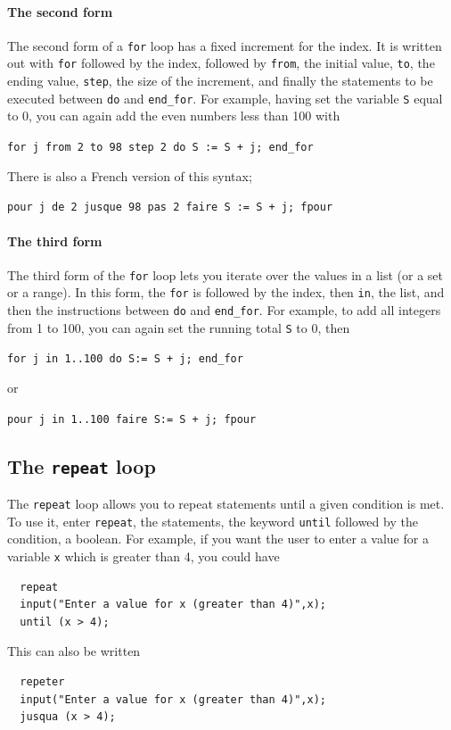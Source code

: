 \documentclass[a4paper,11pt]{book}
\begin{document}
\paragraph{The second form}
The second form of a \texttt{for} loop has a fixed increment for the
index.  It is
written out with \texttt{for} followed by the index, followed by
\texttt{from}, the initial value, \texttt{to}, the ending value,
\texttt{step}, the size of the increment, and finally the statements
to be executed between \texttt{do} and \texttt{end\_for}.  For
example, having set the variable \texttt{S} equal to 0, you can again
add the even numbers less than 100 with
\begin{center}
  {\tt for j from 2 to 98 step 2 do S := S + j; end\_for}
\end{center}
There is also a French version of this syntax;
\begin{center}
  {\tt pour j de 2 jusque 98 pas 2 faire S := S + j; fpour}
\end{center}

\paragraph{The third form}
The third form of the \texttt{for} loop lets you iterate over the
values in a list (or a set or a range).  In this form, the
\texttt{for} is followed by the index, then \texttt{in}, the list, and
then the instructions between \texttt{do} and \texttt{end\_for}.  For
example, to add all integers from 1 to 100, you can again set the
running total \texttt{S} to 0, then
\begin{center}
  {\tt for j in 1..100 do S:= S + j; end\_for}
\end{center}
or
\begin{center}
  {\tt pour j in 1..100 faire S:= S + j; fpour}
\end{center}

\subsection{The \texttt{repeat} loop}

The \texttt{repeat} loop allows you to repeat statements until a given
condition is met.  To use it, enter \texttt{repeat}, the statements,
the keyword \texttt{until} followed by the condition, a
boolean.  For example, if you want the user to enter a value for a
variable \texttt{x} which is greater than 4, you could have
\begin{verbatim}
  repeat
  input("Enter a value for x (greater than 4)",x);
  until (x > 4);
\end{verbatim}
This can also be written
\begin{verbatim}
  repeter
  input("Enter a value for x (greater than 4)",x);
  jusqua (x > 4);
\end{verbatim}
\end{document}
